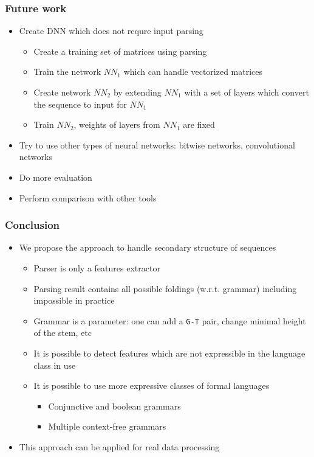 \documentclass[xcolor=table]{beamer}
\begin{document}
\begin{frame} \frametitle{Future work}

\begin{itemize}
 \item Create DNN which does not requre input parsing
 \begin{itemize}
   \item Create a training set of matrices using parsing
   \item Train the network $NN_1$ which can handle vectorized matrices
   \item Create network $NN_2$ by extending $NN_1$ with a set of layers which convert the sequence to input for $NN_1$
   \item Train $NN_2$, weights of layers from $NN_1$ are fixed
 \end{itemize}
 \item Try to use other types of neural networks: bitwise networks, convolutional networks
 \item Do more evaluation
 \item Perform comparison with other tools
\end{itemize}

\end{frame}

\begin{frame} \frametitle{Conclusion}

\begin{itemize}
 \item We propose the approach to handle secondary structure of sequences
 \begin{itemize}
   \item Parser is only a features extractor
   \item Parsing result contains all possible foldings (w.r.t. grammar) including impossible in practice
   \item Grammar is a parameter: one can add a \texttt{G-T} pair, change minimal height of the stem, etc
   \item It is possible to detect features which are not expressible in the language class in use
   \item It is possible to use more expressive classes of formal languages
   \begin{itemize}
     \item Conjunctive and boolean grammars
     \item Multiple context-free grammars
   \end{itemize}
 \end{itemize}

 \item This approach can be applied for real data processing

\end{itemize}

\end{frame}
\end{document}
